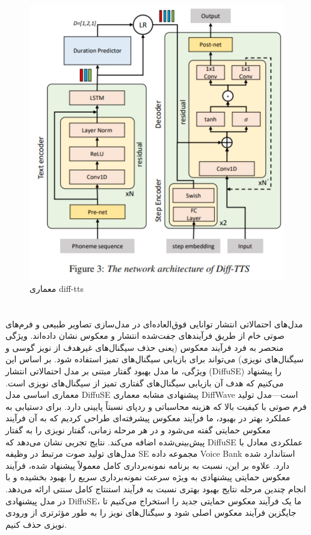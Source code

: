 \documentclass[fleqn]{report}
\begin{document}
\begin{figure}[h]

    \centering
    \includegraphics[width=.6\textwidth, keepaspectratio]{images/diff-tts.jpg}
    
    \caption{معماری diff-tts}
    \label{fig:diff-tts}
\end{figure}

\section{}
مدل‌های احتمالاتی انتشار توانایی فوق‌العاده‌ای در مدل‌سازی تصاویر طبیعی و فرم‌های صوتی خام از طریق فرآیندهای جفت‌شده انتشار و معکوس نشان داده‌اند. ویژگی منحصر به فرد فرآیند معکوس (یعنی حذف سیگنال‌های غیرهدف از نویز گوسی و سیگنال‌های نویزی) می‌تواند برای بازیابی سیگنال‌های تمیز استفاده شود. بر اساس این ویژگی، ما مدل بهبود گفتار مبتنی بر مدل احتمالاتی انتشار (DiffuSE) را پیشنهاد می‌کنیم که هدف آن بازیابی سیگنال‌های گفتاری تمیز از سیگنال‌های نویزی است. معماری اساسی مدل DiffuSE پیشنهادی مشابه معماری DiffWave است—مدل تولید فرم صوتی با کیفیت بالا که هزینه محاسباتی و ردپای نسبتاً پایینی دارد. برای دستیابی به عملکرد بهتر در بهبود، ما فرآیند معکوس پیشرفته‌ای طراحی کردیم که به آن فرآیند معکوس حمایتی گفته می‌شود و در هر مرحله زمانی، گفتار نویزی را به گفتار پیش‌بینی‌شده اضافه می‌کند. نتایج تجربی نشان می‌دهد که DiffuSE عملکردی معادل با مدل‌های تولید صوت مرتبط در وظیفه SE مجموعه داده Voice Bank استاندارد شده دارد. علاوه بر این، نسبت به برنامه نمونه‌برداری کامل معمولاً پیشنهاد شده، فرآیند معکوس حمایتی پیشنهادی به ویژه سرعت نمونه‌برداری سریع را بهبود بخشیده و با انجام چندین مرحله نتایج بهبود بهتری نسبت به فرآیند استنتاج کامل سنتی ارائه می‌دهد.
در مدل پیشنهادی DiffuSE، ما یک فرآیند معکوس حمایتی جدید را استخراج می‌کنیم تا جایگزین فرآیند معکوس اصلی شود و سیگنال‌های نویز را به طور مؤثرتری از ورودی نویزی حذف کنیم.
\end{document}
